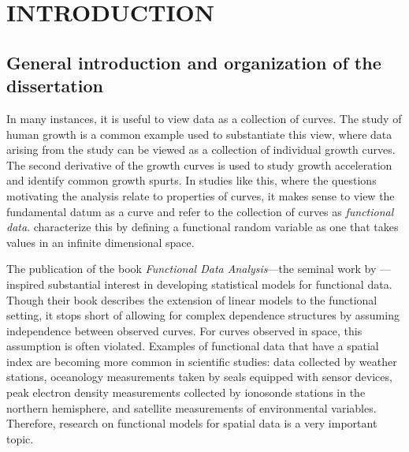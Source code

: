 
\chapter{INTRODUCTION}

\section{General introduction and organization of the dissertation}
In many instances, it is useful to view data as a collection of curves. The study of human growth is a common example used to substantiate this view, where data arising from the study can be viewed as a collection of individual growth curves.  The second derivative of the growth curves is used to study growth acceleration and identify common growth spurts. In studies like this, where the questions motivating the analysis relate to properties of curves, it makes sense to view the fundamental datum as a curve and refer to the collection of curves as \emph{functional data}.  \cite{ferraty2006nonparametric} characterize this by defining a functional random variable as one that takes values in an infinite dimensional space. 

The publication of the book \emph{Functional Data Analysis}---the seminal work by \cite{FDA}---inspired substantial interest in developing statistical models for functional data.  Though their book describes the extension of linear models to the functional setting, it stops short of allowing for complex dependence structures by assuming independence between observed curves. For curves observed in space, this assumption is often violated. Examples of functional data that have a spatial index are becoming more common in scientific studies: data collected by weather stations, oceanology measurements taken by seals equipped with sensor devices, peak electron density measurements collected by ionosonde stations in the northern hemisphere, and satellite measurements of environmental variables. Therefore,  research on functional models for spatial data is a very important topic.

 


